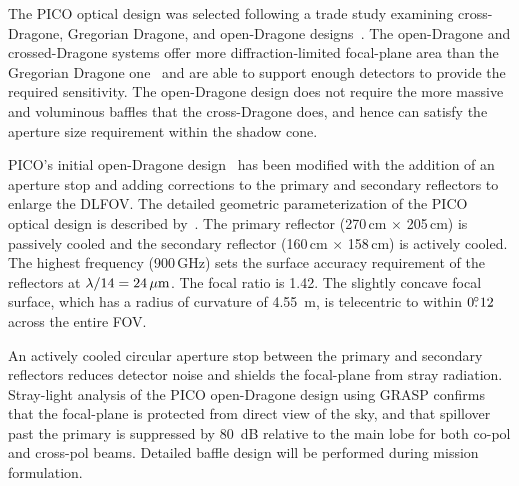 
The PICO optical design was selected following a trade study examining cross-Dragone, Gregorian Dragone, and open-Dragone designs~\citep{Young2018}.  The open-Dragone and crossed-Dragone systems offer more diffraction-limited focal-plane area than the Gregorian Dragone one~\citep{deBernardis2018} and are able to support enough detectors to provide the required sensitivity. The open-Dragone design does not require the more massive and voluminous baffles that the cross-Dragone does, and hence can satisfy the aperture size requirement within the shadow cone.

PICO's initial open-Dragone design~\citep{dragone78, granet2001} has been modified with the addition of an aperture stop and adding corrections to the primary and secondary reflectors to enlarge the DLFOV. The detailed geometric parameterization of the PICO optical design is described by~\citet{Young2018}. The primary reflector (270\,cm $\times$ 205\,cm) is passively cooled and the secondary reflector (160\,cm $\times$ 158\,cm) is actively cooled. The highest frequency (900\,GHz) sets the surface accuracy requirement of the reflectors at $\lambda/14 =24\,\mu{\rm m}$. The focal ratio is 1.42. The slightly concave focal surface, which has a radius of curvature of 4.55~m, is telecentric to within $0.\!\!^\circ12$ across the entire FOV.

An actively cooled circular aperture stop between the primary and secondary reflectors reduces detector noise and shields the focal-plane from stray radiation. Stray-light analysis of the PICO open-Dragone design using GRASP confirms that the focal-plane is protected from direct view of the sky, and that spillover past the primary is suppressed by 80~dB relative to the main lobe for both co-pol and cross-pol beams. Detailed baffle design will be performed during mission formulation.

